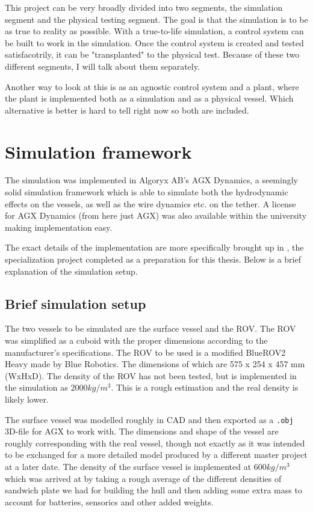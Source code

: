 \documentclass[class=article, crop=false]{standalone}
\begin{document}
This project can be very broadly divided into two segments, the simulation segment and the physical testing segment. The goal is that the simulation is to be as true to reality as possible. With a true-to-life simulation, a control system can be built to work in the simulation. Once the control system is created and tested satisfacotrily, it can be "transplanted" to the physical test. Because of these two different segments, I will talk about them separately.

Another way to look at this is as an agnostic control system and a plant, where the plant is implemented both as a simulation and as a physical vessel. Which alternative is better is hard to tell right now so both are included.
\section{Simulation framework}
The simulation was implemented in Algoryx AB's AGX Dynamics, a seemingly solid simulation framework which is able to simulate both the hydrodynamic effects on the vessels, as well as the wire dynamics etc. on the tether. A license for AGX Dynamics (from here just AGX) was also available within the university making implementation easy.

The exact details of the implementation are more specifically brought up in \citet{specialization}, the specialization project completed as a preparation for this thesis. Below is a brief explanation of the simulation setup.

\subsection{Brief simulation setup}
The two vessels to be simulated are the surface vessel and the ROV. The ROV was simplified as a cuboid with the proper dimensions according to the manufacturer's specifications. The ROV to be used is a modified BlueROV2 Heavy made by Blue Robotics. The dimensions of which are 575 x 254 x 457 mm (WxHxD). The density of the ROV has not been tested, but is implemented in the simulation as \(2000kg/m^3\). This is a rough estimation and the real density is likely lower.

The surface vessel was modelled roughly in CAD and then exported as a \texttt{.obj} 3D-file for AGX to work with. The dimensions and shape of the vessel are roughly corresponding with the real vessel, though not exactly as it was intended to be exchanged for a more detailed model produced by a different master project at a later date. The density of the surface vessel is implemented at \(600kg/m^3\) which was arrived at by taking a rough average of the different densities of sandwich plate we had for building the hull and then adding some extra mass to account for batteries, sensorics and other added weights.
\end{document}
